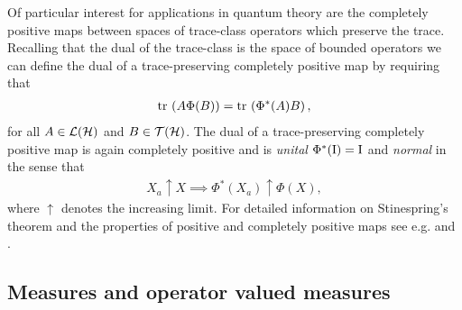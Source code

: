 Of particular interest for applications in quantum theory are the completely positive maps between spaces of trace-class operators which preserve the trace. Recalling that the dual of the trace-class is the space of bounded operators we can define the dual of a trace-preserving completely positive map by requiring that
\begin{align}
  \tr{A \Phi(B)} = \tr{\Phi^*(A) B},
\end{align}
for all $A\in\bops[\hcal]$ and $B\in\trops[\hcal]$. The dual of a trace-preserving completely positive map is again completely positive and is \emph{unital} $\Phi^*(\operatorname{I}) = \operatorname{I}$ and \emph{normal} in the sense that
\begin{align}
  X_a \uparrow X \implies \Phi^*(X_a) \uparrow \Phi(X),
\end{align}
where $\uparrow$ denotes the increasing limit. For detailed information on Stinespring's theorem and the properties of positive and completely positive maps see e.g. \cite{stormer1963} and \cite{stormer1974}.

\subsection{Measures and operator valued measures}


